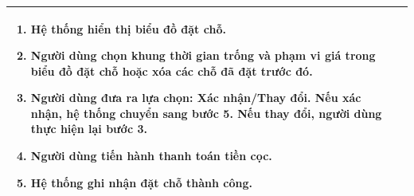 \begin{enumerate}
\begin{center}{\color{black}}
\begin{tabular}{|p{5cm}|p{7cm}|}
\begin{enumerate}[1.]
                \item Hệ thống hiển thị biểu đồ đặt chỗ. 
                \item Người dùng chọn khung thời gian trống và phạm vi giá trong biểu đồ đặt chỗ hoặc xóa các chỗ đã đặt trước đó.
                
				\item Người dùng đưa ra lựa chọn: Xác nhận/Thay đổi. Nếu xác nhận, hệ thống chuyển sang bước 5. Nếu thay đổi, người dùng thực hiện lại bước 3.
				
				\item Người dùng tiến hành thanh toán tiền cọc.
				\item Hệ thống ghi nhận đặt chỗ thành công.
			
            \end{enumerate}\\
         
        \hline
       
        
    \end{tabular}
    \end{center}




\end{enumerate}

